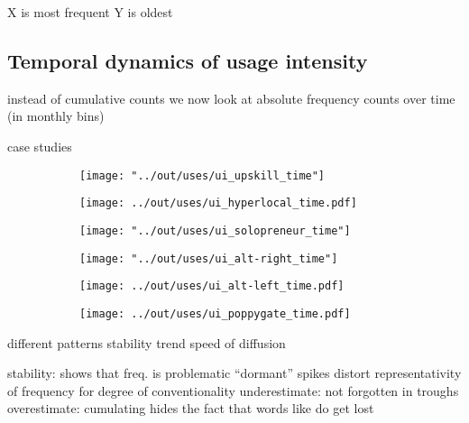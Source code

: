 \documentclass[draft, a4paper, abstract=on]{scrartcl}
\begin{document}
  X is most frequent
  Y is oldest

    \subsection{Temporal dynamics of usage intensity}

  instead of cumulative counts we now look at absolute frequency counts over time (in monthly bins)

  case studies

  \begin{figure}
  \caption{Temporal dynamics in usage frequency for case studies.}
  \centering
  \begin{subfigure}{.3\linewidth}
  \caption{}
  \texttt{[image: "../out/uses/ui\_upskill\_time"]}
  \end{subfigure}
  \begin{subfigure}{.3\linewidth}
  \caption{}
  \texttt{[image: ../out/uses/ui\_hyperlocal\_time.pdf]}
  \end{subfigure}
  \begin{subfigure}{.3\linewidth}
  \caption{}
  \texttt{[image: "../out/uses/ui\_solopreneur\_time"]}
  \end{subfigure}

  \begin{subfigure}{.3\linewidth}
  \caption{}
  \texttt{[image: "../out/uses/ui\_alt-right\_time"]}
  \end{subfigure}
  \begin{subfigure}{.3\linewidth}
  \caption{}
  \texttt{[image: ../out/uses/ui\_alt-left\_time.pdf]}
  \end{subfigure}
  \begin{subfigure}{.3\linewidth}
  \caption{}
  \texttt{[image: ../out/uses/ui\_poppygate\_time.pdf]}
  \end{subfigure}
  \end{figure}

  different patterns
  stability
  trend
  speed of diffusion

  stability: shows that freq. is problematic
  \enquote{dormant}
  spikes distort representativity of frequency for degree of conventionality
  underestimate:  not forgotten in troughs
  overestimate: cumulating hides the fact that words like  do get lost
\end{document}
